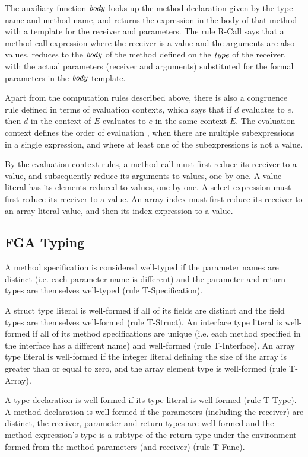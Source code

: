 The auxiliary function $\mathit{body}$ looks up the method declaration given by the
type name and method name, and returns the expression in the body of that method
with a template for the receiver and parameters. The rule R-Call says that a
method call expression where the receiver is a value and the arguments are also
values, reduces to the $\mathit{body}$ of the method defined on the $\mathit{type}$ of the
receiver, with the actual parameters (receiver and arguments) substituted for
the formal parameters in the $\mathit{body}$ template.

Apart from the computation rules described above, there is also a congruence
rule defined in terms of evaluation contexts, which says that if $d$ evaluates
to $e$, then $d$ in the context of $E$ evaluates to $e$ in the same context $E$.
The evaluation context defines the order of evaluation \autocite{evalContexts},
when there are multiple subexpressions in a single expression, and where at
least one of the subexpressions is not a value.

By the evaluation context rules, a method call must first reduce its receiver to
a value, and subsequently reduce its arguments to values, one by one. A value
literal has its elements reduced to values, one by one. A select expression must
first reduce its receiver to a value. An array index must first reduce its
receiver to an array literal value, and then its index expression to a value.

\subsection{FGA Typing}
\label{sec:fg-appx-typing}

A method specification is considered well-typed if the parameter names are
distinct (i.e. each parameter name is different) and the parameter and return
types are themselves well-typed (rule T-Specification).

A struct type literal is well-formed if all of its fields are distinct and the
field types are themselves well-formed (rule T-Struct). An interface type
literal is well-formed if all of its method specifications are unique (i.e.
each method specified in the interface has a different name) and well-formed
(rule T-Interface). An array type literal is well-formed if the integer literal
defining the size of the array is greater than or equal to zero, and the array
element type is well-formed (rule T-Array).

A type declaration is well-formed if its type literal is well-formed (rule
T-Type). A method declaration is well-formed if the parameters (including the
receiver) are distinct, the receiver, parameter and return types are well-formed
and the method expression's type is a subtype of the return type under the
environment formed from the method parameters (and receiver) (rule T-Func).

